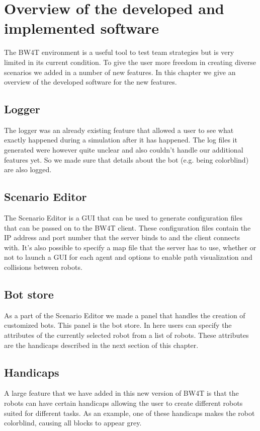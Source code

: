 \chapter{Overview of the developed and implemented software}
The BW4T environment is a useful tool to test team strategies but is very limited in its current condition. To give the user more freedom in creating diverse scenarios we added in a number of new features. In this chapter we give an overview of the developed software for the new features.

\section{Logger}
The logger was an already existing feature that allowed a user to see what exactly happened during a simulation after it has happened. The log files it generated were however quite unclear and also couldn't handle our additional features yet. So we made sure that details about the bot (e.g. being colorblind) are also logged.

\section{Scenario Editor}
The Scenario Editor is a GUI that can be used to generate configuration files that can be passed on to the BW4T client. These configuration files contain the IP address and port number that the server binds to and the client connects with. It's also possible to specify a map file that the server has to use, whether or not to launch a GUI for each agent and options to enable path visualization and collisions between robots.

\section{Bot store}
As a part of the Scenario Editor we made a panel that handles the creation of customized bots. This panel is the bot store. In here users can specify the attributes of the currently selected robot from a list of robots. These attributes are the handicaps described in the next section of this chapter.

\section{Handicaps}
A large feature that we have added in this new version of BW4T is that the robots can have certain handicaps allowing the user to create different robots suited for different tasks. As an example, one of these handicaps makes the robot colorblind, causing all blocks to appear grey.

